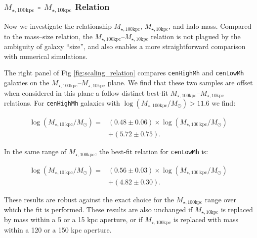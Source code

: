 \documentclass[a4paper,fleqn,usenatbib]{mnras}
\def\rbcg{\texttt{cenHighMh}}
\def\nbcg{\texttt{cenLowMh}}
\def\mhalo{{$M_{\mathrm{200b}}$}}
\def\minn{{$M_{\star,10\mathrm{kpc}}$}}
\def\mtot{{$M_{\star,100\mathrm{kpc}}$}}
\def\logmtot{{$\log (M_{\star,100\mathrm{kpc}}/M_{\odot})$}}
\begin{document}
\subsubsection{\mtot{} - \minn{} Relation}
    \label{sssec:m100_m10}
    
    Now we investigate the relationship \mtot{}, \minn{}, and halo mass. Compared to the mass--size relation, the \mtot{}--\minn{} relation is not plagued by the ambiguity of galaxy ``size'', and also enables a more straightforward comparison with numerical simulations.
    
    The right panel of Fig \ref{fig:scaling_relation} compares \rbcg{} and \nbcg{}
    galaxies on the \mtot{}--\minn{} plane. We find that these two samples are offset when considered in this plane a follow distinct best-fit \mtot{}--\minn{} relations. 
    For \rbcg{} galaxies with \logmtot{}$>11.6$ we find:
    
    \begin{equation}
        \begin{aligned}
        \log (M_{\star, 10\ \mathrm{kpc}}/M_{\odot}) = & (0.48\pm0.06) \times \log (M_{\star, 100\ \mathrm{kpc}}/M_{\odot}) \\ & +(5.72\pm0.75).
        \end{aligned}
    \end{equation}
    
    \noindent In the same range of \mtot{}, the best-fit relation for \nbcg{} is:
     
    \begin{equation}
        \begin{aligned}
        \log (M_{\star, 10\ \mathrm{kpc}}/M_{\odot}) = & (0.56\pm0.03) \times \log (M_{\star, 100\ \mathrm{kpc}}/M_{\odot}) \\ & +(4.82\pm0.30).
        \end{aligned}
    \end{equation}
    
    These results are robust against the exact choice for the \mtot{} range over which the fit is performed. These results are also unchanged if \minn{} is replaced by mass within a 5 or a 15 kpc aperture, or if \mtot{} is replaced with mass within a 120 or a 150 kpc aperture.  
    
     
\end{document}
